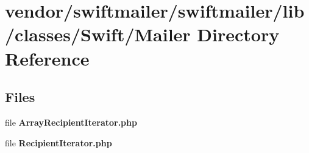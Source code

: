 \section{vendor/swiftmailer/swiftmailer/lib/classes/\+Swift/\+Mailer Directory Reference}
\label{dir_6aa9d8b7c10573b074e322884012a68f}
\subsection*{Files}
\begin{DoxyCompactItemize}
\item 
file {\bf Array\+Recipient\+Iterator.\+php}
\item 
file {\bf Recipient\+Iterator.\+php}
\end{DoxyCompactItemize}

